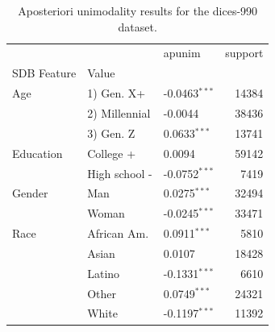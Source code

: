 \begin{table}[ht]\centering
\caption{Aposteriori unimodality results for the dices-990 dataset.}
\label{tab:dices-990}
\begin{tabular}{lllr}
\toprule
 &  & apunim & support \\
SDB Feature & Value &  &  \\
\midrule
Age & 1) Gen. X+ & -0.0463$^{***}$ & 14384 \\
 & 2) Millennial & -0.0044 & 38436 \\
 & 3) Gen. Z & 0.0633$^{***}$ & 13741 \\
Education & College + & 0.0094 & 59142 \\
 & High school - & -0.0752$^{***}$ & 7419 \\
Gender & Man & 0.0275$^{***}$ & 32494 \\
 & Woman & -0.0245$^{***}$ & 33471 \\
Race & African Am. & 0.0911$^{***}$ & 5810 \\
 & Asian & 0.0107 & 18428 \\
 & Latino & -0.1331$^{***}$ & 6610 \\
 & Other & 0.0749$^{***}$ & 24321 \\
 & White & -0.1197$^{***}$ & 11392 \\
\bottomrule
\end{tabular}
\end{table}
